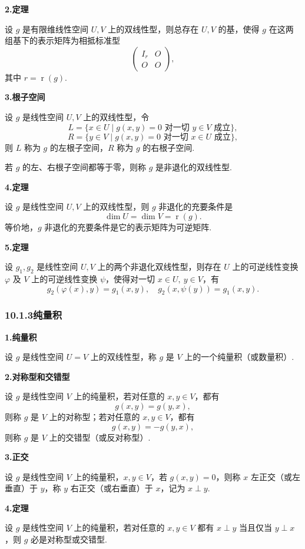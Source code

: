 \documentclass[UTF8,12pt,a4paper,fontset=fandol]{ctexart}
\begin{document}
\noindent\textbf{2.\quad 定理}

设 $g$ 是有限维线性空间 $U,V$ 上的双线性型，则总存在 $U,V$ 的基，使得 $g$ 在这两组基下的表示矩阵为相抵标准型
\[
\left(\begin{array}{cc}
I_r & O\\
O & O
\end{array}\right),
\]
其中 $r=\operatorname{r}(g)$.

\noindent\textbf{3.\quad 根子空间}

设 $g$ 是线性空间 $U,V$ 上的双线性型，令
\[
L=\{x\in U\mid g(x,y)=0\text{ 对一切 }y\in V\text{ 成立}\},
\]
\[
R=\{y\in V\mid g(x,y)=0\text{ 对一切 }x\in U\text{ 成立}\},
\]
则 $L$ 称为 $g$ 的左根子空间，$R$ 称为 $g$ 的右根子空间.

若 $g$ 的左、右根子空间都等于零，则称 $g$ 是非退化的双线性型.

\noindent\textbf{4.\quad 定理}

设 $g$ 是线性空间 $U,V$ 上的双线性型，则 $g$ 非退化的充要条件是
\[
\dim U=\dim V=\operatorname{r}(g).
\]
等价地，$g$ 非退化的充要条件是它的表示矩阵为可逆矩阵.

\noindent\textbf{5.\quad 定理}

设 $g_1,g_2$ 是线性空间 $U,V$ 上的两个非退化双线性型，则存在 $U$ 上的可逆线性变换 $\varphi$ 及 $V$ 上的可逆线性变换 $\psi$，使得对一切 $x\in U,\ y\in V$，有
\[
g_2(\varphi(x),y)=g_1(x,y),\quad g_2(x,\psi(y))=g_1(x,y).
\]

\subsubsection*{10.1.3\quad 纯量积}

\noindent\textbf{1.\quad 纯量积}

设 $g$ 是线性空间 $U=V$ 上的双线性型，称 $g$ 是 $V$ 上的一个纯量积（或数量积）.

\noindent\textbf{2.\quad 对称型和交错型}

设 $g$ 是线性空间 $V$ 上的纯量积，若对任意的 $x,y\in V$，都有
\[
g(x,y)=g(y,x),
\]
则称 $g$ 是 $V$ 上的对称型；若对任意的 $x,y\in V$，都有
\[
g(x,y)=-g(y,x),
\]
则称 $g$ 是 $V$ 上的交错型（或反对称型）.

\noindent\textbf{3.\quad 正交}

设 $g$ 是线性空间 $V$ 上的纯量积，$x,y\in V$，若 $g(x,y)=0$，则称 $x$ 左正交（或左垂直）于 $y$，称 $y$ 右正交（或右垂直）于 $x$，记为 $x\perp y$.

\noindent\textbf{4.\quad 定理}

设 $g$ 是线性空间 $V$ 上的纯量积，若对任意的 $x,y\in V$ 都有 $x\perp y$ 当且仅当 $y\perp x$，则 $g$ 必是对称型或交错型.
\end{document}
